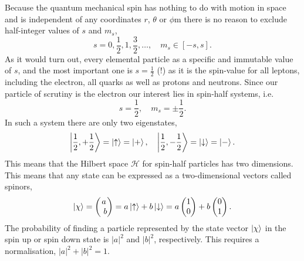     Because the quantum mechanical spin has nothing to do with motion in space and 
    is independent of any coordinates $r$, $\theta$ or $\phi$m there is no reason to 
    exclude half-integer values of $s$ and $m_s$,
    \begin{equation}
        s=0,\frac{1}{2},1,\frac{3}{2},\dots, \quad m_s\in[-s, s].
    \end{equation}
    As it would turn out, every elemental particle as a specific and immutable value of 
    $s$, and the most important one is $s=\frac{1}{2}$ (!) as it is the spin-value for 
    all leptons, including the electron, all quarks as well as protons and neutrons. Since 
    our particle of scrutiny is the electron our interest lies in spin-half systems, i.e. 
    \begin{equation}
        s = \frac{1}{2}, \quad m_s = \pm \frac{1}{2}.
    \end{equation}
    In such a system there are only two eigenstates,
    \begin{equation}
        \ket{\frac{1}{2},+\frac{1}{2}} = \ket{\uparrow} = \ket{+}, \quad
        \ket{\frac{1}{2},-\frac{1}{2}} = \ket{\downarrow} = \ket{-}.
    \end{equation}
    This means that the Hilbert space $\mathcal{H}$ for spin-half particles has 
    two dimensions. This means that any state can be expressed as a two-dimensional 
    vectors called spinors,
    \begin{equation}
        \ket{\chi} = \begin{pmatrix}
            a \\ b
        \end{pmatrix}
        = a\ket{\uparrow} + b\ket{\downarrow}
        = a\begin{pmatrix}
            1 \\ 0 
        \end{pmatrix}
        + b\begin{pmatrix}
            0 \\ 1
        \end{pmatrix}.
    \end{equation}
    The probability of finding a particle represented by the state vector $\ket{\chi}$
    in the spin up or spin down state is $|a|^2$ and $|b|^2$, respectively. This requires 
    a normalisation, $|a|^2 + |b|^2 = 1$.

